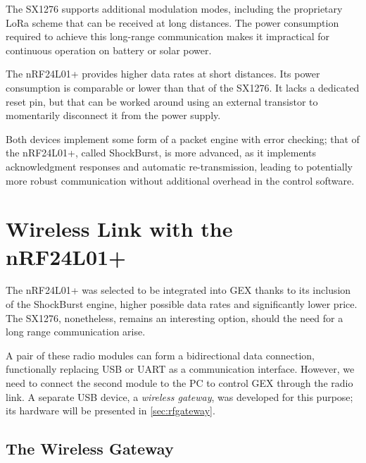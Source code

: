 The SX1276 supports additional modulation modes, including the proprietary LoRa scheme that can be received at long distances. The power consumption required to achieve this long-range communication makes it impractical for continuous operation on battery or solar power.

The nRF24L01+ provides higher data rates at short distances. Its power consumption is comparable or lower than that of the SX1276. It lacks a dedicated reset pin, but that can be worked around using an external transistor to momentarily disconnect it from the power supply.

Both devices implement some form of a packet engine with error checking; that of the nRF24L01+, called ShockBurst, is more advanced, as it implements acknowledgment responses and automatic re-transmission, leading to potentially more robust communication without additional overhead in the control software.


\section{Wireless Link with the nRF24L01+}

The nRF24L01+ was selected to be integrated into GEX thanks to its inclusion of the ShockBurst engine, higher possible data rates and significantly lower price. The SX1276, nonetheless, remains an interesting option, should the need for a long range communication arise.

A pair of these radio modules can form a bidirectional data connection, functionally replacing \gls{USB} or \gls{UART} as a communication interface. However, we need to connect the second module to the \gls{PC} to control GEX through the radio link. A separate \gls{USB} device, a \textit{wireless gateway}, was developed for this purpose; its hardware will be presented in \cref{sec:rfgateway}.

\subsection{The Wireless Gateway}

